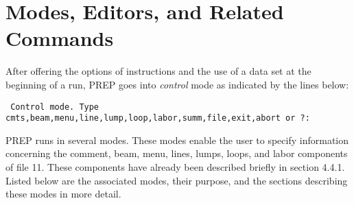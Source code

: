 \section{Modes, Editors, and Related Commands} After offering the options
of instructions and the use of a data set at the beginning of a run, PREP
goes into {\em control} mode as indicated by the lines below:
\begin{footnotesize}
\begin{verbatim}
 Control mode. Type
cmts,beam,menu,line,lump,loop,labor,summ,file,exit,abort or ?:
\end{verbatim}
\end{footnotesize} PREP runs in several modes. These modes enable the user
to specify information concerning the comment, beam, menu, lines, lumps,
loops, and labor components of file 11. These components have already been
described briefly in section 4.4.1. Listed below are the associated modes,
their purpose, and the sections describing these modes in more detail.

